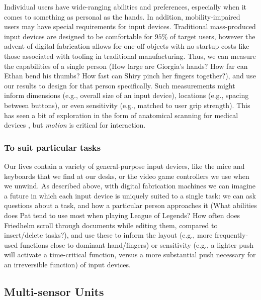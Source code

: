     Individual users have wide-ranging abilities and preferences, especially when it comes to something as personal as the hands. In addition, mobility-impaired users may have special requirements for input devices. Traditional mass-produced input devices are designed to be comfortable for $95$\% of target users, however the advent of digital fabrication allows for one-off objects with no startup costs like those associated with tooling in traditional manufacturing. Thus, we can measure the capabilities of a single person (How large are Giorgia's hands? How far can Ethan bend his thumbs? How fast can Shiry pinch her fingers together?), and use our results to design for that person specifically. Such measurements might inform dimensions (e.g., overall size of an input device), locations (e.g., spacing between buttons), or even sensitivity (e.g., matched to user grip strength). This has seen a bit of exploration in the form of anatomical scanning for medical devices \cite{smakman-curatio}, but \emph{motion} is critical for interaction.

    \subsubsection{To suit particular tasks}
    
    Our lives contain a variety of general-purpose input devices, like the mice and keyboards that we find at our desks, or the video game controllers we use when we unwind. As described above, with digital fabrication machines we can imagine a future in which each input device is uniquely suited to a single task: we can ask questions about a task, and how a particular person approaches it (What abilities does Pat tend to use most when playing League of Legends? How often does Friedhelm scroll through documents while editing them, compared to insert/delete tasks?), and use these to inform the layout (e.g., more frequently-used functions close to dominant hand/fingers) or sensitivity (e.g., a lighter push will activate a time-critical function, versus a more substantial push necessary for an irreversible function) of input devices.
    
\subsection{Multi-sensor Units}

